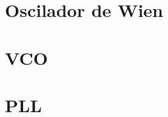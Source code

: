 







\tableofcontents
\newpage

\section{Oscilador de Wien}
	
	
\section{VCO}	
		
	
\section{PLL}
	

